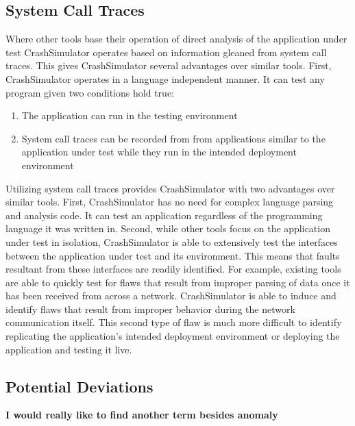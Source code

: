     \subsection{System Call Traces}

        Where other tools base their operation of direct analysis of the application under test CrashSimulator operates
        based on information gleaned from system call traces. This gives CrashSimulator several advantages over similar
        tools. First, CrashSimulator operates in a language independent manner. It can test any program given two
        conditions hold true:

        \begin{enumerate}
            \item{The application can run in the testing environment}
            \item{System call traces can be recorded from from applications similar to the application under test while
                they run in the intended deployment environment}
        \end{enumerate}

        Utilizing system call traces provides CrashSimulator with two advantages over similar tools. First,
        CrashSimulator has no need for complex language parsing and analysis code. It can test an application regardless
        of the programming language it was written in. Second, while other tools focus on the application under test in
        isolation, CrashSimulator is able to extensively test the interfaces between the application under test and its
        environment. This means that faults resultant from these interfaces are readily identified. For example,
        existing tools are able to quickly test for flaws that result from improper parsing of data once it
        has been received from across a network. CrashSimulator is able to induce and identify flaws that result from
        improper behavior during the network communication itself. This second type of flaw is much more difficult to
        identify replicating the application's intended deployment environment or deploying the application and testing
        it live.

    \subsection{Potential Deviations}

        \textbf{I would really like to find another term besides anomaly}


